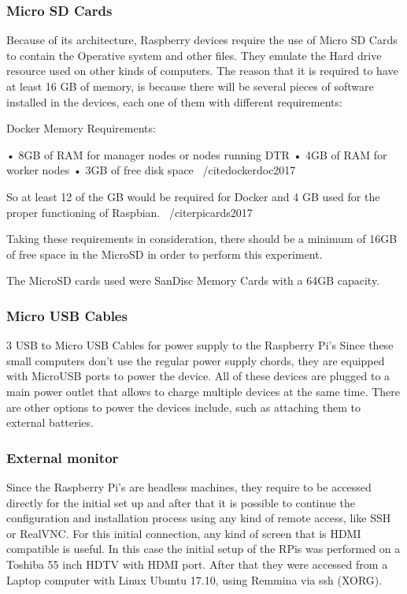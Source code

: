 \documentclass[sigconf]{acmart}
\begin{document}
	
	\subsubsection{Micro SD Cards}
	
	Because of its architecture, Raspberry devices require the use of Micro SD Cards to contain the Operative system and other files. They emulate the Hard drive resource used on other kinds of computers.
	The reason that it is required to have at least 16 GB of memory, is because there will be several pieces of software installed in the devices, each one of them with different requirements:
	
	Docker Memory Requirements:
	
	• 8GB of RAM for manager nodes or nodes running DTR
	• 4GB of RAM for worker nodes
	• 3GB of free disk space
	~/cite{dockerdoc2017}
	
	So at least 12 of the GB would be required for Docker and 4 GB used for the proper functioning of Raspbian. ~/cite{rpicards2017}
	
	Taking these requirements in consideration, there should be a minimum of 16GB of free space in the MicroSD in order to perform this experiment. 
	
	The MicroSD cards used were SanDisc Memory Cards with a 64GB capacity.
	
	\subsubsection{Micro USB Cables}
	3 USB to Micro USB Cables for power supply to the Raspberry Pi’s
	Since these small computers don’t use the regular power supply chords, they are equipped with MicroUSB ports to power the device.
	All of these devices are plugged to a main power outlet that allows to charge multiple devices at the same time.
	There are other options to power the devices include, such as attaching them to external batteries.
	
	\subsubsection{External monitor}
	
	Since the Raspberry Pi’s are headless machines, they require to be accessed directly for the initial set up and after that it is possible to continue the configuration and installation process using any kind of remote access, like SSH or RealVNC.
	For this initial connection, any kind of screen that is HDMI compatible is useful.
	In this case the initial setup of the RPis was performed on a Toshiba 55 inch HDTV with HDMI port. After that they were accessed from a Laptop computer with Linux Ubuntu 17.10, using Remmina via ssh (XORG).
	
\end{document}
